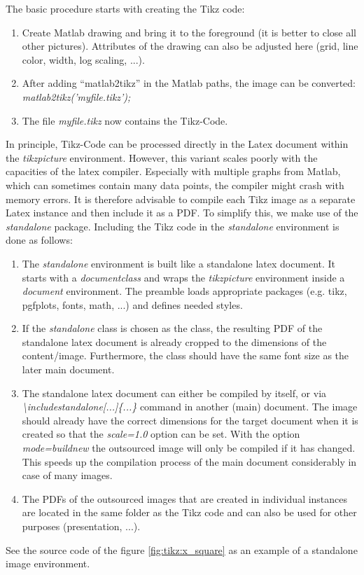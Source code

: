 The basic procedure starts with creating the Tikz code:
\begin{enumerate}
	\item Create Matlab drawing and bring it to the foreground (it is better to close all other pictures). Attributes of the drawing can also be adjusted here (grid, line color, width, log scaling, ...).
	\item After adding "`matlab2tikz"' in the Matlab paths, the image can be converted: \\
		\textit{matlab2tikz('myfile.tikz');}
	\item The file \textit{myfile.tikz} now contains the Tikz-Code.
\end{enumerate}

In principle, Tikz-Code can be processed directly in the Latex document within the \textit{tikzpicture} environment.
However, this variant scales poorly with the capacities of the latex compiler.
Especially with multiple graphs from Matlab, which can sometimes contain many data points, the compiler might crash with memory errors.
It is therefore advisable to compile each Tikz image as a separate Latex instance and then include it as a PDF.
To simplify this, we make use of the \textit{standalone} package.
Including the Tikz code in the \textit{standalone} environment is done as follows:
\begin{enumerate}
	\item The \textit{standalone} environment is built like a standalone latex document.
	It starts with a \textit{documentclass} and wraps the \textit{tikzpicture} environment inside a \textit{document} environment.
	The preamble loads appropriate packages (e.g. tikz, pgfplots, fonts, math, ...) and defines needed styles.
	\item If the \textit{standalone} class is chosen as the class, the resulting PDF of the standalone latex document is already cropped to the dimensions of the content/image.
	Furthermore, the class should have the same font size as the later main document.
	\item The standalone latex document can either be compiled by itself, or via \textit{\textbackslash includestandalone[...]\{...\}} command in another (main) document.
	The image should already have the correct dimensions for the target document when it is created so that the \textit{scale=1.0} option can be set.
	With the option \textit{mode=buildnew} the outsourced image will only be compiled if it has changed.
	This speeds up the compilation process of the main document considerably in case of many images.
	\item The PDFs of the outsourced images that are created in individual instances are located in the same folder as the Tikz code and can also be used for other purposes (presentation, ...).
\end{enumerate}
See the source code of the figure \ref{fig:tikz:x_square} as an example of a standalone image environment.


